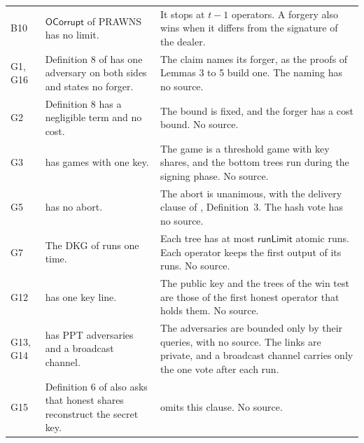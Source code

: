 \documentclass[11pt]{article}
\newcommand{\rowrule}{\specialrule{0.2pt}{2.5pt}{2.5pt}}
\begin{document}
{\begin{xltabular}{\textwidth}{@{}l>{\raggedright\arraybackslash}X>{\raggedright\arraybackslash}X@{}}
\rowrule
B10 & $\mathsf{OCorrupt}$ of PRAWNS has no limit. & It stops at $t-1$ operators. A forgery also
wins when it differs from the signature of the dealer. \\
\rowrule
G1, G16 & Definition 8 of \cite{GJM+21} has one adversary on both sides and states no forger. &
The claim names its forger, as the proofs of Lemmas 3 to 5 build one. The naming has no source. \\
\rowrule
G2 & Definition 8 has a negligible term and no cost. & The bound is fixed, and the forger has a
cost bound. No source. \\
\rowrule
G3 & \cite{GJM+21} has games with one key. & The game is a threshold game with key shares, and the
bottom trees run during the signing phase. No source. \\
\rowrule
G5 & \cite{GJM+21} has no abort. & The abort is unanimous, with the delivery clause of
\cite{GL05}, Definition~3. The hash vote has no source. \\
\rowrule
G7 & The DKG of \cite{GJM+21} runs one time. & Each tree has at most $\mathsf{runLimit}$ atomic
runs. Each operator keeps the first output of its runs. No source. \\
\rowrule
G12 & \cite{GJM+21} has one key line. & The public key and the trees of the win test are those of
the first honest operator that holds them. No source. \\
\rowrule
G13, G14 & \cite{GJM+21} has PPT adversaries and a broadcast channel. & The adversaries are bounded
only by their queries, with no source. The links are private, and a broadcast channel carries
only the one vote after each run. \\
\rowrule
G15 & Definition 6 of \cite{GJM+21} also asks that honest shares reconstruct the secret key. &
 omits this clause. No source. \\
\bottomrule
\end{xltabular}}
\end{document}
